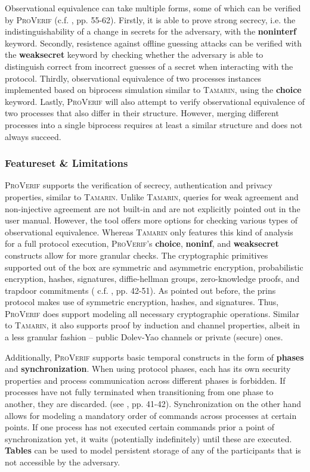 Observational equivalence can take multiple forms, some of which can be verified by \textsc{ProVerif} (c.f. \cite{blanchet2020proverif}, pp. 55-62).
Firstly, it is able to prove strong secrecy, i.e. the indistinguishability of a change in secrets for the adversary, with the \textsf{\textbf{noninterf}} keyword.
Secondly, resistence against offline guessing attacks can be verified with the \textsf{\textbf{weaksecret}} keyword by checking whether the adversary is able to distinguish correct from incorrect guesses of a secret when interacting with the protocol.
Thirdly, observational equivalence of two processes instances implemented based on biprocess simulation similar to \textsc{Tamarin}, using the \textsf{\textbf{choice}} keyword.
Lastly, \textsc{ProVerif} will also attempt to verify observational equivalence of two processes that also differ in their structure.
However, merging different processes into a single biprocess requires at least a similar structure and does not always succeed.

\subsubsection{Featureset \& Limitations}

\textsc{ProVerif} supports the verification of secrecy, authentication and privacy properties, similar to \textsc{Tamarin}.
Unlike \textsc{Tamarin}, queries for weak agreement and non-injective agreement are not built-in and are not explicitly pointed out in the user manual.
However, the tool offers more options for checking various types of observational equivalence.
Whereas \textsc{Tamarin} only features this kind of analysis for a full protocol execution, \textsc{ProVerif}'s \textbf{choice}, \textbf{noninf}, and \textbf{weaksecret} constructs allow for more granular checks. 
The cryptographic primitives supported out of the box are symmetric and asymmetric encryption, probabilistic encryption, hashes, signatures, diffie-hellman groups,
zero-knowledge proofs, and trapdoor commitments ( c.f. \cite{blanchet2020proverif}, pp. 42-51).
As pointed out before, the \gls{prins} protocol makes use of symmetric encryption, hashes, and signatures.
Thus, \textsc{ProVerif} does support modeling all necessary cryptographic operations.
Similar to \textsc{Tamarin}, it also supports proof by induction and channel properties, albeit in a less granular fashion -- public Dolev-Yao channels or private (secure) ones.

Additionally, \textsc{ProVerif} supports basic temporal constructs in the form of \textbf{phases} and \textbf{synchronization}.
When using protocol phases, each has its own security properties and process communication across different phases is forbidden.
If processes have not fully terminated when transitioning from one phase to another, they are discarded. (see \cite{blanchet2020proverif}, pp. 41-42).
Synchronization on the other hand allows for modeling a mandatory order of commands across processes at certain points.
If one process has not executed certain commands prior a point of synchronization yet, it waits (potentially indefinitely) until these are executed.
\textbf{Tables} can be used to model persistent storage of any of the participants that is not accessible by the adversary.